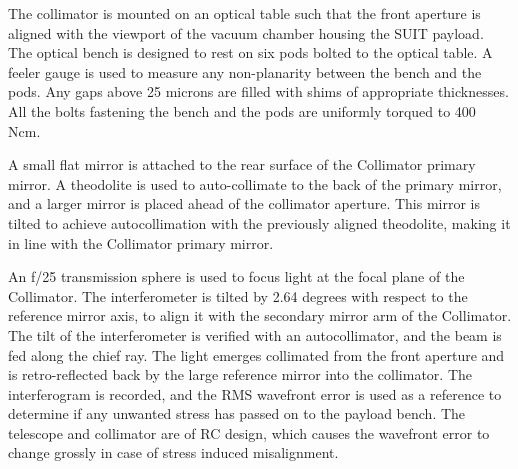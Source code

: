 \documentclass[12pt]{spieman}  %
\begin{document}
The collimator is mounted on an optical table such that the front aperture is aligned with the viewport of the vacuum chamber housing the SUIT payload. The optical bench is designed to rest on six pods bolted to the optical table. A feeler gauge is used to measure any non-planarity between the bench and the pods. Any gaps above 25 microns are filled with shims of appropriate thicknesses. All the bolts fastening the bench and the pods are uniformly torqued to 400 Ncm. 

A small flat mirror is attached to the rear surface of the Collimator primary mirror. A theodolite is used to auto-collimate to the back of the primary mirror, and a larger mirror is placed ahead of the collimator aperture. This mirror is tilted to achieve autocollimation with the previously aligned theodolite, making it in line with the Collimator primary mirror.

An f/25 transmission sphere is used to focus light at the focal plane of the Collimator. The interferometer is tilted by 2.64 degrees with respect to the reference mirror axis, to align it with the secondary mirror arm of the Collimator. The tilt of the interferometer is verified with an autocollimator, and the beam is fed along the chief ray. The light emerges collimated from the front aperture and is retro-reflected back by the large reference mirror into the collimator. The interferogram is recorded, and the RMS wavefront error is used as a reference to determine if any unwanted stress has passed on to the payload bench. The telescope and collimator are of RC design, which causes the wavefront error to change grossly in case of stress induced misalignment.
\end{document}
